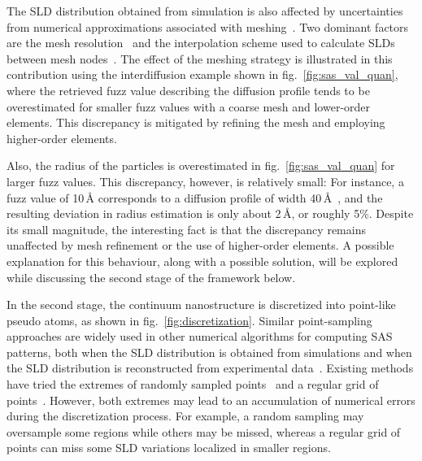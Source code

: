 \documentclass[preprint, 5p, times, twocolumn]{elsarticle}
\begin{document}
The SLD distribution obtained from simulation is also affected by uncertainties from numerical approximations associated with meshing~\cite{mecozzi2011quantitative,eiken2012numerical,zhuang2022phase}. Two dominant factors are the mesh resolution~\cite{wasisto2014finite,lo2002finite,suresh2014effect} and the interpolation scheme used to calculate SLDs between mesh nodes~\cite{taylor1972completeness}. The effect of the meshing strategy is illustrated in this contribution using the interdiffusion example shown in fig.~\ref{fig:sas_val_quan}, where the retrieved fuzz value describing the diffusion profile tends to be overestimated for smaller fuzz values with a coarse mesh and lower-order elements. This discrepancy is mitigated by refining the mesh and employing higher-order elements.

Also, the radius of the particles is overestimated in fig.~\ref{fig:sas_val_quan} for larger fuzz values. This discrepancy, however, is relatively small: For instance, a fuzz value of 10\,\AA{} corresponds to a diffusion profile of width 40\,\AA{}~\cite{fuzzysphereurl}, and the resulting deviation in radius estimation is only about 2\,\AA{}, or roughly 5\%. Despite its small magnitude, the interesting fact is that the discrepancy remains unaffected by mesh refinement or the use of higher-order elements. A possible explanation for this behaviour, along with a possible solution, will be explored while discussing the second stage of the framework below.

In the second stage, the continuum nanostructure is discretized into point-like pseudo atoms, as shown in fig.~\ref{fig:discretization}. Similar point-sampling approaches are widely used in other numerical algorithms for computing SAS patterns, both when the SLD distribution is obtained from simulations and when the SLD distribution is reconstructed from experimental data~\cite{alves2018calculation, dorrell2020combined,li2022model2sas}. Existing methods have tried the extremes of randomly sampled points~\cite{dorrell2020combined, deumer2022small, larsen2023shape2sas} and a regular grid of points~\cite{svergun1999restoring, schmidt2007simulation,li2022model2sas}. However, both extremes may lead to an accumulation of numerical errors during the discretization process. For example, a random sampling may oversample some regions while others may be missed, whereas a regular grid of points can miss some SLD variations localized in smaller regions.
\end{document}
